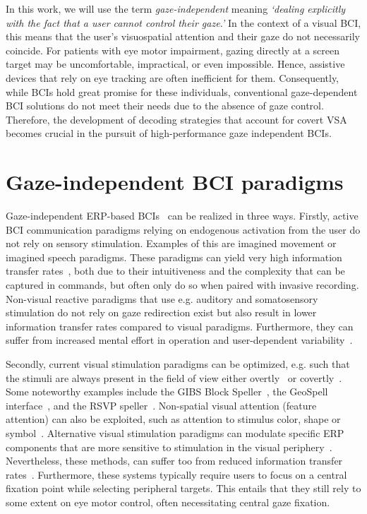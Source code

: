 In this work, we will use the term \emph{gaze-independent} meaning
\emph{‘dealing explicitly with the fact that a user cannot control their
gaze.'}
In the context of a visual BCI, this means that the user's
visuospatial attention and their gaze do not necessarily coincide.
For patients with eye motor impairment, gazing directly at a screen target may
be uncomfortable, impractical, or even impossible.
Hence, assistive devices that rely on eye tracking are often inefficient for
them.
Consequently, while BCIs hold great promise for these individuals, conventional
gaze-dependent BCI solutions do not meet their needs due to the absence of gaze
control. Therefore, the development of decoding strategies that account for covert
VSA becomes crucial in the pursuit of high-performance gaze independent
BCIs.



\section{Gaze-independent BCI paradigms}
\label{sec:gaze-independence}

Gaze-independent ERP-based BCIs~\cite{Riccio2012, Aloise2012} can be realized in three
ways.
Firstly, active BCI communication paradigms relying on endogenous activation from the user
do not rely on sensory stimulation.
Examples of this are imagined movement or imagined speech paradigms.
These paradigms can yield very high information transfer
rates~\cite{Willett2021,Metzger2023}, both due to their intuitiveness and the
complexity that can be captured in commands, but often only do so when paired
with invasive recording.
Non-visual reactive paradigms that use e.g. auditory and somatosensory
stimulation do not rely on gaze redirection exist but also result in lower information transfer
rates compared to visual paradigms.
Furthermore, they can suffer from increased mental effort in operation and user-dependent variability~\cite{Reichert2020b}.

Secondly, current visual stimulation paradigms can be optimized, e.g. such that
the stimuli are always present in the field of view either overtly~\cite{Acqualagna2013, Won2018,
Lin2018} or covertly~\cite{Treder2010,Pires2011,Lees2018}. Some noteworthy examples include the GIBS Block Speller~\parencite{Pires2011},
the GeoSpell interface~\parencite{Aloise2012}, and the RSVP
speller~\parencite{Acqualagna2011}.
Non-spatial visual attention (feature attention) can also be exploited, such as
attention to stimulus color, shape or symbol~\cite{Zhang2010,Treder2011,Hwang2015}.
Alternative visual stimulation paradigms can modulate specific ERP components
that are more sensitive to stimulation in the visual periphery~\cite{Schaeff2012,Xu2022}.
Nevertheless, these methods, can suffer too from reduced information
transfer rates~\cite{Chennu2013}.
Furthermore, these systems typically require users to focus on a central fixation point while
selecting peripheral targets.
This entails that they still rely to some extent on
eye motor control, often necessitating central gaze fixation.

